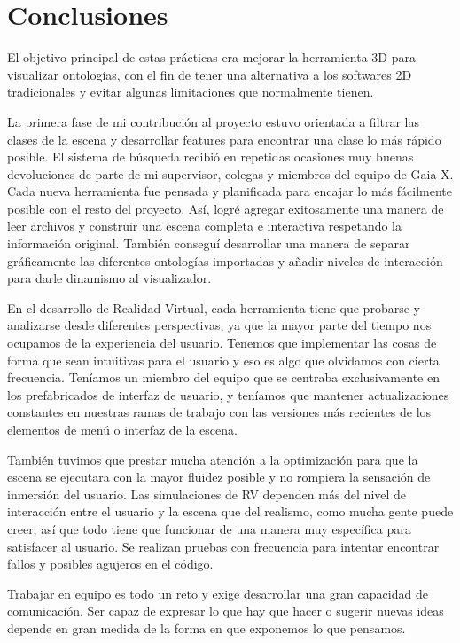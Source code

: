 \chapter*{Conclusiones}

El objetivo principal de estas prácticas era mejorar la herramienta 3D para visualizar ontologías, con el fin de tener una alternativa a los softwares 2D tradicionales y evitar algunas limitaciones que normalmente tienen.

La primera fase de mi contribución al proyecto estuvo orientada a filtrar las clases de la escena y desarrollar features para encontrar una clase lo más rápido posible. El sistema de búsqueda recibió en repetidas ocasiones muy buenas devoluciones de parte de mi supervisor, colegas y miembros del equipo de Gaia-X.
Cada nueva herramienta fue pensada y planificada para encajar lo más fácilmente posible con el resto del proyecto. Así, logré agregar exitosamente una manera de leer archivos y construir una escena completa e interactiva respetando la información original. También conseguí desarrollar una manera de separar gráficamente las diferentes ontologías importadas y añadir niveles de interacción para darle dinamismo al visualizador.

En el desarrollo de Realidad Virtual, cada herramienta tiene que probarse y analizarse desde diferentes perspectivas, ya que la mayor parte del tiempo nos ocupamos de la experiencia del usuario. Tenemos que implementar las cosas de forma que sean intuitivas para el usuario
y eso es algo que olvidamos con cierta frecuencia. Teníamos un miembro del equipo que se centraba exclusivamente en los prefabricados de interfaz de usuario, y teníamos que mantener actualizaciones constantes en nuestras ramas de trabajo con las versiones más recientes de los elementos de menú o interfaz de la escena.

También tuvimos que prestar mucha atención a la optimización para que la escena se ejecutara con la mayor fluidez posible y no rompiera la sensación de inmersión del usuario. Las simulaciones de RV dependen más del nivel de interacción entre el usuario y la escena que del realismo,
como mucha gente puede creer, así que todo tiene que funcionar de una manera muy específica para satisfacer al usuario. Se realizan pruebas con frecuencia para intentar encontrar fallos y posibles agujeros en el código.

Trabajar en equipo es todo un reto y exige desarrollar una gran capacidad de comunicación. Ser capaz de expresar lo que hay que hacer o sugerir nuevas ideas depende en gran medida de la forma en que exponemos lo que pensamos.

